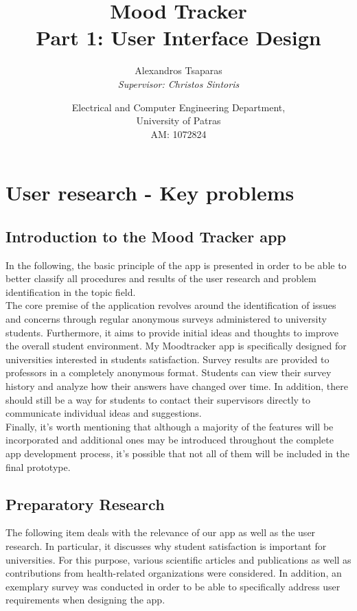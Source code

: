 \documentclass[11pt]{report}
\title{\Huge \textbf{Mood Tracker}\vspace{2mm} \\
    \large Part 1: User Interface Design}
\author{\vspace*{1cm}\Large Alexandros Tsaparas
\\ \textit{Supervisor: Christos Sintoris}
\and Electrical and Computer Engineering Department,
\\University of Patras\vspace{5mm} \\
AM: 1072824}
\date{}
\begin{document}
\maketitle 
\vspace{5mm}
\tableofcontents

\chapterfont{\LARGE \centering}
\chaptertitlefont{\Large \centering}
\chapter{User research - Key problems}

\section{Introduction to the Mood Tracker app}

In the following, the basic principle of the app is presented in order to be able to better classify all procedures and results of the user research and problem identification in the topic field.\\
The core premise of the application revolves around the identification of issues and concerns through regular anonymous surveys administered to university students. Furthermore, it aims to provide initial ideas and thoughts to improve the overall student environment. My Moodtracker app is specifically designed for universities interested in students satisfaction. Survey results are provided to professors in a completely anonymous format. Students can view their survey history and analyze how their answers have changed over time. In addition, there should still be a way for students to contact their supervisors directly to communicate individual ideas and suggestions.\\
Finally, it's worth mentioning that although a majority of the features will be incorporated and additional ones may be introduced throughout the complete app development process, it's possible that not all of them will be included in the final prototype.

\section{Preparatory Research}

The following item deals with the relevance of our app as well as the user research. In particular, it discusses why student satisfaction is important for universities. For this purpose, various scientific articles and publications as well as contributions from health-related organizations were considered. In addition, an exemplary survey was conducted in order to be able to specifically address user requirements when designing the app.
\end{document}
